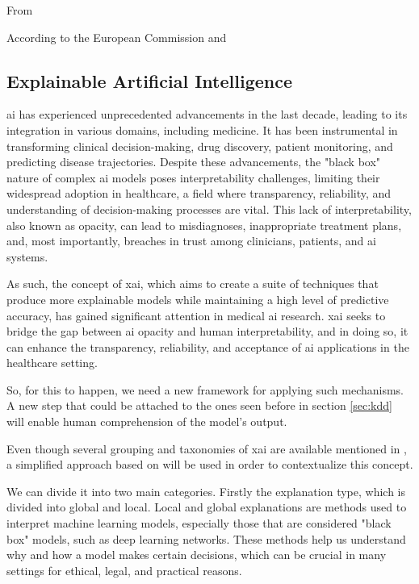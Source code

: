 From \cite{DBLP:books/aw/RN2020}

According to the European Commission \cite{DefinitionAIMain2019} and \cite{EthicsGuidelinesTrustworthy2019}




\subsection{Explainable Artificial Intelligence}
\ac{ai} has experienced unprecedented advancements in the last decade, leading to its integration in various domains, including medicine. It has been instrumental in transforming clinical decision-making, drug discovery, patient monitoring, and predicting disease trajectories. Despite these advancements, the "black box" nature of complex \ac{ai} models poses interpretability challenges, limiting their widespread adoption in healthcare, a field where transparency, reliability, and understanding of decision-making processes are vital. This lack of interpretability, also known as opacity, can lead to misdiagnoses, inappropriate treatment plans, and, most importantly, breaches in trust among clinicians, patients, and \ac{ai} systems.

As such, the concept of \ac{xai}, which aims to create a suite of techniques that produce more explainable models while maintaining a high level of predictive accuracy, has gained significant attention in medical \ac{ai} research. \ac{xai} seeks to bridge the gap between \ac{ai} opacity and human interpretability, and in doing so, it can enhance the transparency, reliability, and acceptance of \ac{ai} applications in the healthcare setting.

So, for this to happen, we need a new framework for applying such mechanisms. A new step that could be attached to the ones seen before in section \ref{sec:kdd} will enable human comprehension of the model's output.

Even though several grouping and taxonomies of \ac{xai} are available mentioned in \cite{adadiPeekingBlackBoxSurvey2018,linardatosExplainableAIReview2020,barredoarrietaExplainableArtificialIntelligence2020,linardatosExplainableAIReview2020,kamath2021explainable}, a simplified approach based on \cite{kamath2021explainable} will be used in order to contextualize this concept.

We can divide it into two main categories. Firstly the explanation type, which is divided into global and local. Local and global explanations are methods used to interpret machine learning models, especially those that are considered "black box" models, such as deep learning networks. These methods help us understand why and how a model makes certain decisions, which can be crucial in many settings for ethical, legal, and practical reasons.

